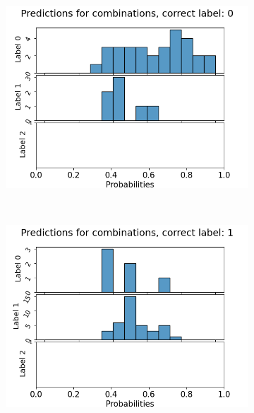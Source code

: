 \begin{figure}
  \begin{subfigure}[t]{0.3\textwidth}
    \includegraphics[width=\textwidth]{files/figs/app/hists/femval/pc0.png}
  \end{subfigure}
  ~
  \begin{subfigure}[t]{0.3\textwidth}
    \includegraphics[width=\textwidth]{files/figs/app/hists/femval/pc1.png}
  \end{subfigure}
  ~
  \begin{subfigure}[t]{0.3\textwidth}

\end{subfigure}
\end{figure}
